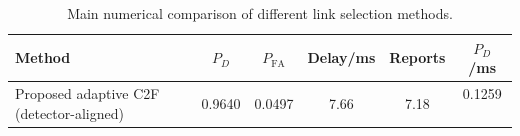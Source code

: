 \begin{table}[t]
    \centering
    \caption{Main numerical comparison of different link selection methods.}
    \label{tab:main_summary}
    \begin{tabular}{l c c c c c}
        \hline
        Method & $P_D$ & $P_{\mathrm{FA}}$ & Delay/ms & Reports & $P_D$/ms \\
        \hline
        Proposed adaptive C2F (detector-aligned) & 0.9640 & 0.0497 & 7.66 & 7.18 & 0.1259 \
        \hline
    \end{tabular}
\end{table}
